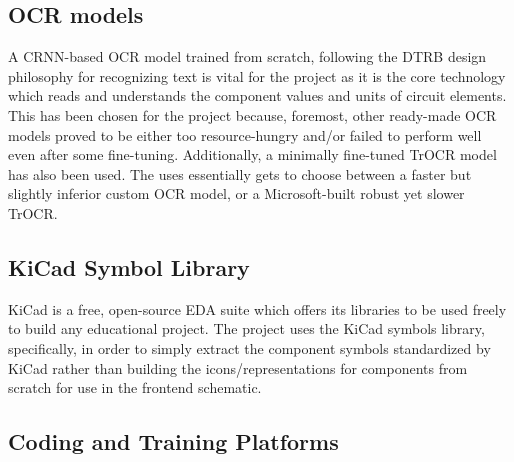 \subsection{OCR models}

A CRNN-based OCR model trained from scratch, following the DTRB design philosophy for recognizing text is vital for the project as it is the core technology which reads and understands the component values and units of circuit elements. This has been chosen for the project because, foremost, other ready-made OCR models proved to be either too resource-hungry and/or failed to perform well even after some fine-tuning. Additionally, a minimally fine-tuned TrOCR model has also been used. The uses essentially gets to choose between a faster but slightly inferior custom OCR model, or a Microsoft-built robust yet slower TrOCR.

\subsection{KiCad Symbol Library}

KiCad is a free, open-source EDA suite which offers its libraries to be used freely to build any educational project. The project uses the KiCad symbols library, specifically, in order to simply extract the component symbols standardized by KiCad rather than building the icons/representations for components from scratch for use in the frontend schematic.
\subsection{Coding and Training Platforms}

